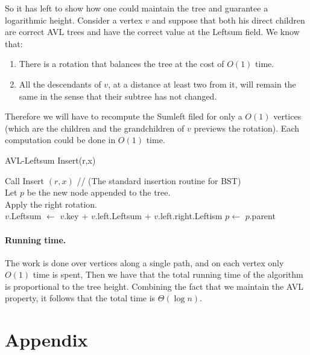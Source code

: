 So it has left to show how one could maintain the tree and guarantee a logarithmic height. Consider a vertex $v$ and suppose that both
his direct children are correct AVL trees and have the correct value at the Leftsum field. We know that:
\begin{enumerate}
  \item There is a rotation that balances the tree at the cost of $O(1)$ time.
  \item All the descendants of $v$, at a distance at least two from it,  will remain the same in the sense that their subtree has not changed. 
\end{enumerate}
Therefore we will have to recompute the Sumleft filed for only a $O(1)$ vertices (which are the children and the grandchildren of $v$ previews the rotation). 
Each computation could be done in $O(1)$ time. 


\begin{algbox}{AVL-Leftsum Insert(r,x)}
  \begin{algorithm}[H]
    Call Insert $(r,x)$ // (The standard insertion routine for BST) \\  
    Let $p$ be the new node appended to the tree. \\
     {
      Apply the right rotation. \\
       {
	$v$.Leftsum $\leftarrow$ $v$.key + $v$.left.Leftsum + $v$.left.right.Leftism 		
      }
      $p \leftarrow$ $p$.parent \\  
    }
  \end{algorithm}
\end{algbox}

\paragraph{Running time.} The work is done over vertices along a single path, and on each vertex only $O(1)$ time 
is spent, Then we have that the total running time of the algorithm is proportional to the tree height. 
Combining the fact that we maintain the AVL property, it follows that the total time is $\Theta\left( \log n \right)$.  




\section*{Appendix}
